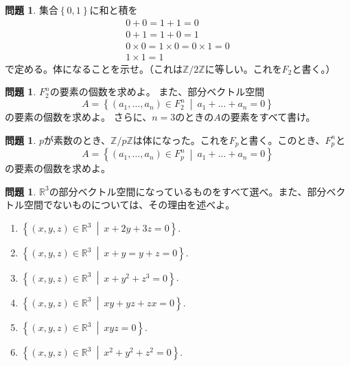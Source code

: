 \documentclass[uplatex]{jsarticle}
\theoremstyle{definition}
\numberwithin{equation}{section}
\newtheorem{prob}[section]{問題}
\newcommand{\midbar}{\ \middle| \ }
\newcommand{\R}{\mathbb{R}}
\newcommand{\Z}{\mathbb{Z}}
\newcommand{\Zp}{\mathbb{Z}/p\mathbb{Z}}
\begin{document}
\begin{prob}
  集合$\left\{ 0,1 \right\}$に和と積を
  \begin{align*}
    0+0 = 1+1 = 0 \\
    0+1 = 1+0 = 1 \\
    0\times 0 = 1\times 0 = 0\times 1=0 \\
    1\times 1 =1
  \end{align*}
  で定める。体になることを示せ。（これは$\Z/2\Z$に等しい。これを$F_2$と書く。）
\end{prob}

\begin{prob}
  $F_2^n$の要素の個数を求めよ。
  また、部分ベクトル空間
  \[A = \left\{ (a_1,\dots, a_n) \in F_2^n \midbar a_1+\dots+a_n = 0 \right\} \]
  の要素の個数を求めよ。
  さらに、$n=3$のときの$A$の要素をすべて書け。
\end{prob}

\begin{prob}
  $p$が素数のとき、$\Zp$は体になった。これを$F_p$と書く。このとき、$F_p^n$と
  \[A = \left\{ (a_1,\dots, a_n) \in F_p^n \midbar a_1+\dots+a_n = 0 \right\} \]
  の要素の個数を求めよ。
\end{prob}

\begin{prob}
  $\R^3$の部分ベクトル空間になっているものをすべて選べ。また、部分ベクトル空間でないものについては、その理由を述べよ。

  \begin{enumerate}
    \item $\left\{ (x,y,z)\in\R^3\midbar x+2y+3z=0 \right\}$.
    \item $\left\{ (x,y,z)\in\R^3\midbar x+y=y+z = 0 \right\}$.
    \item $\left\{ (x,y,z)\in\R^3\midbar x+y^2+z^3=0 \right\}$.
    \item $\left\{ (x,y,z)\in\R^3\midbar xy+yz+zx=0 \right\}$.
    \item $\left\{ (x,y,z)\in\R^3\midbar xyz=0 \right\}$.
    \item $\left\{ (x,y,z)\in\R^3\midbar x^2+y^2+z^2=0 \right\}$.
  \end{enumerate}
\end{prob}
\end{document}
